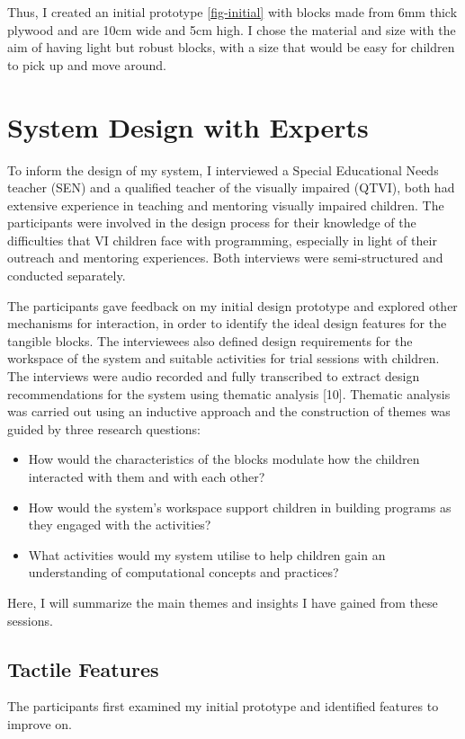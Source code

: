 \documentclass[oneside,%
                    author={Malak Hajji},
                    degree={BSc},
                    title={Designing An Accessible Computational Toolkit For Students},
                  subtitle={With Mixed Visual Abilities}]{dissertation}
\begin{document}
Thus, I created an initial prototype \ref{fig-initial} with blocks made from 6mm thick plywood and are 10cm wide and 5cm high. I chose the material and size with the aim of having light but robust blocks, with a size that would be easy for children to pick up and move around.


\section{System Design with Experts}
To inform the design of my system, I interviewed a Special Educational Needs teacher (SEN) and a qualified teacher of the visually impaired (QTVI), both had extensive experience in teaching and mentoring visually impaired children. The participants were involved in the design process for their knowledge of the difficulties that VI children face with programming, especially in light of their outreach and mentoring experiences. Both interviews were semi-structured and conducted separately.

The participants gave feedback on my initial design prototype and explored other mechanisms for interaction, in order to identify the ideal design features for the tangible blocks. The interviewees also defined design requirements for the workspace of the system and suitable activities for trial sessions with children. 
The interviews were audio recorded and fully transcribed to extract design recommendations for the system using thematic analysis [10]. Thematic analysis was carried out using an inductive approach and the construction of themes was guided by three research questions: 
\begin{itemize}
    \item How would the characteristics of the blocks modulate how the children interacted with them and with each other?
    \item How would the system's workspace support children in building programs as they engaged with the activities? 
    \item What activities would my system utilise to help children gain an understanding of computational concepts and practices?
\end{itemize}
Here, I will summarize the main themes and insights I have gained from these sessions.

\subsection{Tactile Features}
The participants first examined my initial prototype and identified features to improve on.
\end{document}
